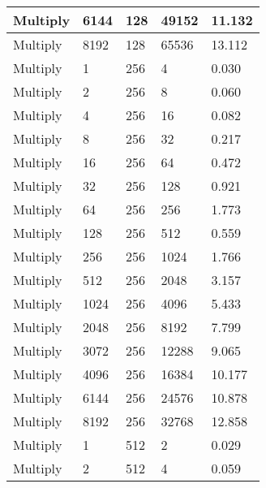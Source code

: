 \documentclass{article}
\begin{document}
\begin{longtable}{|l|l|l|l|l|}
Multiply           & 6144 & 128         & 49152             & 11.132            \\ \hline
Multiply           & 8192 & 128         & 65536             & 13.112            \\ \hline
Multiply           & 1    & 256         & 4                 & 0.030             \\ \hline
Multiply           & 2    & 256         & 8                 & 0.060             \\ \hline
Multiply           & 4    & 256         & 16                & 0.082             \\ \hline
Multiply           & 8    & 256         & 32                & 0.217             \\ \hline
Multiply           & 16   & 256         & 64                & 0.472             \\ \hline
Multiply           & 32   & 256         & 128               & 0.921             \\ \hline
Multiply           & 64   & 256         & 256               & 1.773             \\ \hline
Multiply           & 128  & 256         & 512               & 0.559             \\ \hline
Multiply           & 256  & 256         & 1024              & 1.766             \\ \hline
Multiply           & 512  & 256         & 2048              & 3.157             \\ \hline
Multiply           & 1024 & 256         & 4096              & 5.433             \\ \hline
Multiply           & 2048 & 256         & 8192              & 7.799             \\ \hline
Multiply           & 3072 & 256         & 12288             & 9.065             \\ \hline
Multiply           & 4096 & 256         & 16384             & 10.177            \\ \hline
Multiply           & 6144 & 256         & 24576             & 10.878            \\ \hline
Multiply           & 8192 & 256         & 32768             & 12.858            \\ \hline
Multiply           & 1    & 512         & 2                 & 0.029             \\ \hline
Multiply           & 2    & 512         & 4                 & 0.059             \\ \hline

\end{longtable}
\end{document}
